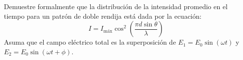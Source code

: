 \item Demuestre formalmente que la distribución de la intensidad promedio en el tiempo para un patrón de doble rendija está dada por la ecuación:
$$ I = I_{\text{máx}} \cos^2 \left( \frac{\pi d \sin\theta}{\lambda} \right) $$
Asuma que el campo eléctrico total es la superposición de $E_1 = E_0 \sin(\omega t)$ y $E_2 = E_0 \sin(\omega t + \phi)$.